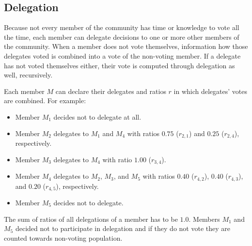 \documentclass{sigchi}
\begin{document}

\subsection{Delegation}
Because not every member of the community has time or knowledge to vote all the time, each member can delegate
decisions to one or more other members of the community.
When a member does not vote themselves, information how those delegates voted is combined into a vote of
the non-voting member.
If a delegate has not voted themselves either, their vote is computed through delegation as well, recursively.

Each member $M$ can declare their delegates and ratios $r$ in which delegates' votes are combined. For example:

\begin{itemize}
\item Member $M_1$ decides not to delegate at all.
\item Member $M_2$ delegates to $M_1$ and $M_4$ with ratios $0.75$ ($r_{2,1}$) and $0.25$ ($r_{2,4}$), respectively.
\item Member $M_3$ delegates to $M_4$ with ratio $1.00$ ($r_{3,4}$).
\item Member $M_4$ delegates to $M_2$, $M_3$, and $M_5$ with ratios $0.40$ ($r_{4,2}$), $0.40$ ($r_{4,3}$), and $0.20$ ($r_{4,5}$), respectively.
\item Member $M_5$ decides not to delegate.
\end{itemize}

The sum of ratios of all delegations of a member has to be $1.0$.
Members $M_1$ and $M_5$ decided not to participate in delegation and if they do not vote they are
counted towards non-voting population.
\end{document}
